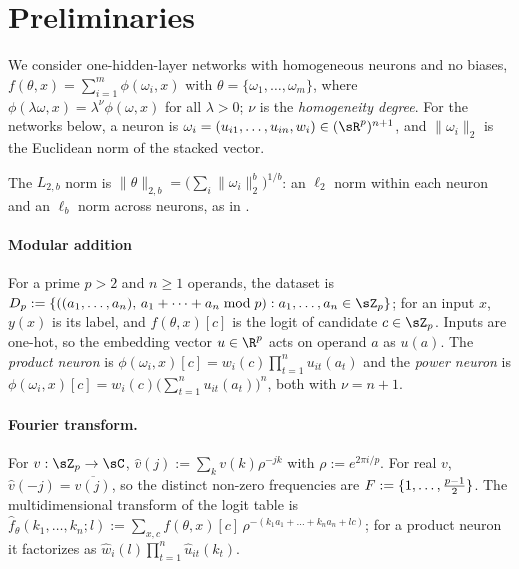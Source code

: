 \section{Preliminaries}\label{sec:prelim}

We consider one-hidden-layer networks with homogeneous neurons and no biases, $f(\theta,x)=\sum_{i=1}^m\phi(\omega_i,x)$ with $\theta=\{\omega_1,\dots,\omega_m\}$, where $\phi(\lambda\omega,x)=\lambda^\nu\phi(\omega,x)$ for all $\lambda>0$; $\nu$ is the \emph{homogeneity degree}. For the networks below, a neuron is $\omega_i=(u_{i1},\dots,u_{in},w_i)\in(\sR^p)^{n+1}$, and $\|\omega_i\|_2$ is the Euclidean norm of the stacked vector.

The $L_{2,b}$ norm is $\|\theta\|_{2,b}=\big(\sum_i\|\omega_i\|_2^b\big)^{1/b}$: an $\ell_2$ norm within each neuron and an $\ell_b$ norm across neurons, as in \citet{morwani2024feature}. 

\paragraph{Modular addition} For a prime $p>2$ and $n\ge1$ operands, the dataset is $D_p:=\{((a_1,\dots,a_n),\,a_1+\dots+a_n\bmod p):a_1,\dots,a_n\in\sZ_p\}$; for an input $x$, $y(x)$ is its label, and $f(\theta,x)[c]$ is the logit of candidate $c\in\sZ_p$. Inputs are one-hot, so the embedding vector $u\in\R^p$ acts on operand $a$ as $u(a)$. The \emph{product neuron} is $\phi(\omega_i,x)[c]=w_i(c)\prod_{t=1}^{n}u_{it}(a_t)$ and the \emph{power neuron} is $\phi(\omega_i,x)[c]=w_i(c)\big(\sum_{t=1}^{n}u_{it}(a_t)\big)^n$, both with $\nu=n+1$. 

\paragraph{Fourier transform.} For $v:\sZ_p\to\sC$, $\hat v(j):=\sum_kv(k)\rho^{-jk}$ with $\rho:=e^{2\pi i/p}$. For real $v$, $\hat v(-j)=\overline{\hat v(j)}$, so the distinct non-zero frequencies are $F:=\{1,\dots,\frac{p-1}2\}$. The multidimensional transform of the logit table is $\hat f_\theta(k_1,\dots,k_n;l):=\sum_{x,c}f(\theta,x)[c]\,\rho^{-(k_1a_1+\dots+k_na_n+lc)}$; for a product neuron it factorizes as $\hat w_i(l)\prod_{t=1}^{n}\hat u_{it}(k_t)$.
